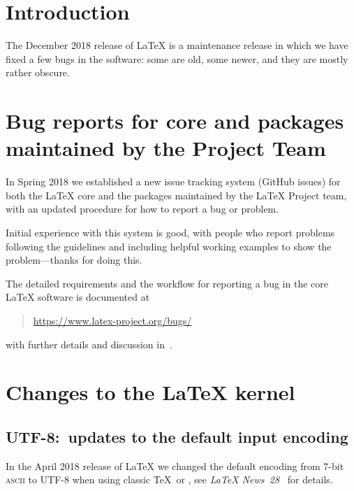 \documentclass{ltnews}
\providecommand\acro[1]{\textsc{#1}}
\begin{document}
\maketitle
\tableofcontents

\setlength{}

\bigskip

\section{Introduction}

The December 2018 release of \LaTeX{} is a maintenance release in
which we have fixed a few bugs in the software: some are old, some
newer, and they are mostly rather obscure.

\section[Bug reports for core \LaTeXe{} and packages]
        {Bug reports for core \LaTeXe{} and packages maintained by the Project Team}

In Spring 2018 we established a new issue tracking system (GitHub
issues) for both the \LaTeX{} core and the packages maintained by the
\LaTeX{} Project team, with an updated procedure for how to report a
bug or problem.

Initial experience with this system is good, with people who report
problems following the guidelines and including helpful working
examples to show the problem---thanks for doing this.

The detailed requirements and the workflow for reporting a bug in the
core \LaTeX{} software is documented at
\begin{quote}
\url{https://www.latex-project.org/bugs/}
\end{quote}
with further details and discussion in~\cite{Mittelbach:TB39-1}.


\section{Changes to the \LaTeX{} kernel}

\subsection{UTF-8:\ updates to the default input encoding}

In the April 2018 release of \LaTeX{} we changed the default encoding
from 7-bit \acro{ascii} to UTF-8 when using classic \TeX\ or
, see \textit{\LaTeX{} News~28}~\cite{ltnews28} for
details.
\end{document}
